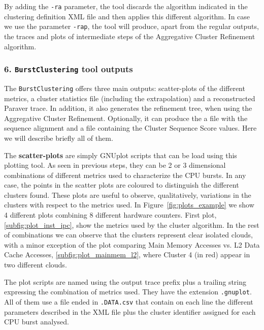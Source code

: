 \documentclass[a4paper, 12pt]{article}
\begin{document}
By adding the \texttt{-ra} parameter, the tool discards the algorithm
indicated in the clustering definition XML file and then applies this
different algorithm. In case we use the parameter \texttt{-rap}, the tool
will produce, apart from the regular outputs, the traces and plots of 
intermediate steps of the Aggregative Cluster Refinement algorithm.

\subsubsection*{6. \texttt{BurstClustering} tool outputs}

The \texttt{BurstClustering} offers three main outputs: scatter-plots of
the different metrics, a cluster statistics file (including the extrapolation)
and a reconstructed Paraver trace. In addition, it also generates the
refinement tree, when using the Aggregative Cluster Refinement. Optionally,
it can produce the a file with the sequence alignment and a file containing
the Cluster Sequence Score values. Here we will describe briefly all of them.

The \textbf{scatter-plots} are simply GNUplot scripts that can be load using
this plotting tool. As seen in previous steps, they can be 2 or 3 dimensional
combinations of different metrics used to characterize the CPU bursts. In any
case, the points in the scatter plots are coloured to distinguish the
different clusters found. These plots are useful to observe, qualitatively,
variations in the clusters with respect to the metrics used. In 
Figure~\ref{fig:plots_example} we show 4 different plots combining 8 different
hardware counters. First plot, \ref{subfig:plot_inst_ipc}, show the metrics
used by the cluster algorithm. In the rest of combinations we can observe that 
the clusters represent clear isolated clouds, with a minor exception of
the plot comparing Main Memory Accesses vs. L2 Data Cache Accesses,
\ref{subfig:plot_mainmem_l2}, where Cluster 4 (in red) appear in two different
clouds.

The plot scripts are named using the output trace prefix plus a trailing
string expressing the combination of metrics used. They have the extension
\texttt{.gnuplot}. All of them use a file ended in \texttt{.DATA.csv} that
contain on each line the different parameters described in the XML file plus 
the cluster identifier assigned for each CPU burst analysed.
\end{document}
